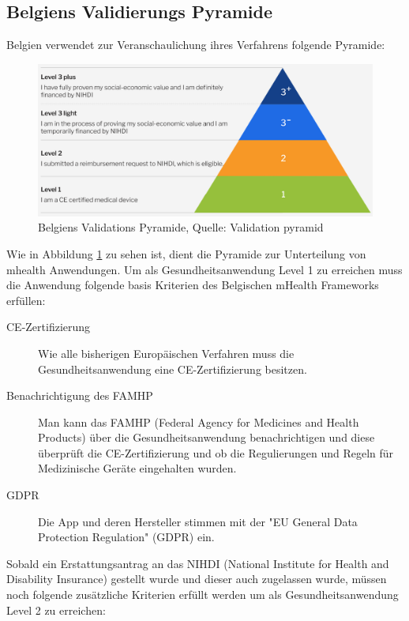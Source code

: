 \documentclass{article}
\begin{document}
		\subsection{Belgiens Validierungs Pyramide}
			Belgien verwendet zur Veranschaulichung ihres Verfahrens folgende Pyramide:\par
			\begin{figure}[htbp]
				\centering
				\includegraphics[width=\textwidth]{./grafiken/belgien_validation_pyramide}
				\caption[Belgiens Verfahren]{Belgiens Validations Pyramide, Quelle: Validation pyramid \cite{belgien-pyramide}}
				\label{belgien-validierung}
			\end{figure}
			Wie in Abbildung \ref{belgien-validierung} zu sehen ist, dient die Pyramide zur Unterteilung von mhealth Anwendungen.
			Um als Gesundheitsanwendung Level 1 zu erreichen muss die Anwendung folgende basis Kriterien des Belgischen mHealth Frameworks erfüllen:
			\begin{description}
				\item[CE-Zertifizierung] Wie alle bisherigen Europäischen Verfahren muss die Gesundheitsanwendung eine CE-Zertifizierung besitzen.
				\item[Benachrichtigung des FAMHP] Man kann das FAMHP (Federal Agency for Medicines and Health Products) über die Gesundheitsanwendung benachrichtigen und diese überprüft die CE-Zertifizierung und ob die Regulierungen und Regeln für Medizinische Geräte eingehalten wurden.    
				\item[GDPR] Die App und deren Hersteller stimmen mit der "EU General Data Protection Regulation" (GDPR) ein.
			\end{description}
			Sobald ein Erstattungsantrag an das NIHDI (National Institute for Health and Disability Insurance) gestellt wurde und dieser auch zugelassen wurde, müssen noch folgende zusätzliche Kriterien erfüllt werden um als Gesundheitsanwendung Level 2 zu erreichen:
\end{document}
